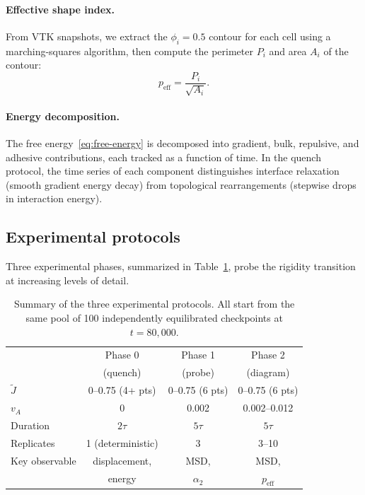 \documentclass[aps,pre,twocolumn,superscriptaddress,longbibliography,floatfix]{revtex4-2}
\newcommand{\vA}{v_{\!A}}                  %
\newcommand{\peff}{p_{\mathrm{eff}}}       %
\newcommand{\Jt}{\tilde{J}}               %
\newcommand{\phii}{\phi_i}                 %
\begin{document}
\paragraph{Effective shape index.}
From VTK snapshots, we extract the $\phii = 0.5$ contour for each cell
using a marching-squares algorithm, then compute the perimeter $P_i$
and area $A_i$ of the contour:
%
\begin{equation}
  \peff = \frac{P_i}{\sqrt{A_i}}.
  \label{eq:peff}
\end{equation}

\paragraph{Energy decomposition.}
The free energy~\eqref{eq:free-energy} is decomposed into gradient,
bulk, repulsive, and adhesive contributions, each tracked as a function
of time.  In the quench protocol, the time series of each component
distinguishes interface relaxation (smooth gradient energy decay) from
topological rearrangements (stepwise drops in interaction energy).

\subsection{Experimental protocols}
\label{sec:methods:protocols}

Three experimental phases, summarized in Table~\ref{tab:protocols}, probe the
rigidity transition at increasing levels of detail.

\begin{table}[t]
  \caption{%
    Summary of the three experimental protocols.  All start from the same
    pool of 100 independently equilibrated checkpoints at $t = 80{,}000$.
  }
  \label{tab:protocols}
  \begin{ruledtabular}
  \begin{tabular}{lccc}
    & Phase 0     & Phase 1       & Phase 2           \\
    & (quench)    & (probe)       & (diagram)         \\ \hline
    $\Jt$
      & 0--0.75 (4+ pts)  & 0--0.75 (6 pts) & 0--0.75 (6 pts) \\
    $\vA$
      & 0               & 0.002          & 0.002--0.012    \\
    Duration
      & $2\tau$          & $5\tau$        & $5\tau$         \\
    Replicates
      & 1 (deterministic)& 3             & 3--10           \\
    Key observable
      & displacement,    & MSD,           & MSD,            \\
      & energy           & $\alpha_2$     & $\peff$         \\
  \end{tabular}
  \end{ruledtabular}
\end{table}
\end{document}
